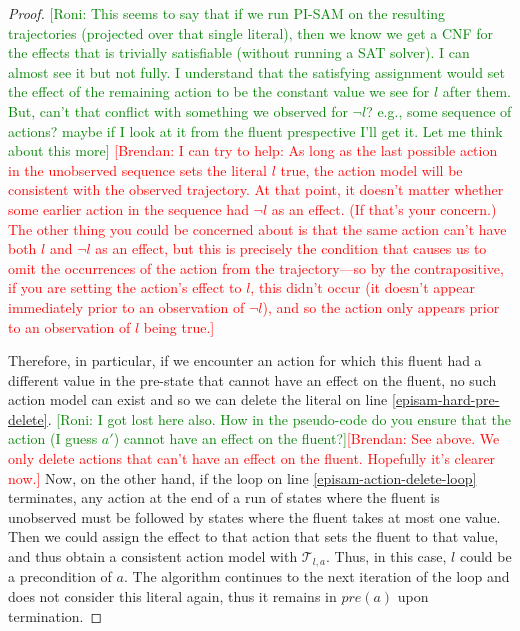 \documentclass[letterpaper]{article} %
\newcommand{\pre}{\textit{pre}}
\newcommand{\brendan}[1]{{\textcolor{red}{[Brendan: #1]}}}
\newcommand{\roni}[1]{{\textcolor{green}{[Roni: #1]}}}
\begin{document}
\begin{proof}
\roni{This seems to say that if we run PI-SAM on the resulting trajectories (projected over that single literal), then we know we get a CNF for the effects that is trivially satisfiable  (without running a SAT solver). I can almost see it but not fully. I understand that the satisfying assignment would set the effect of the remaining action to be the constant value we see for $l$ after them. But, can't that conflict with something we observed for $\neg l$? e.g., some sequence of actions? maybe if I look at it from the fluent prespective I'll get it. Let me think about this more} \brendan{I can try to help: As long as the last possible action in the unobserved sequence sets the literal $l$ true, the action model will be consistent with the observed trajectory. At that point, it doesn't matter whether some earlier action in the sequence had $\neg l$ as an effect. (If that's your concern.) The other thing you could be concerned about is that the same action can't have both $l$ and $\neg l$ as an effect, but this is precisely the condition that causes us to omit the occurrences of the action from the trajectory---so by the contrapositive, if you are setting the action's effect to $l$, this didn't occur (it doesn't appear immediately prior to an observation of $\neg l$), and so the action only appears prior to an observation of $l$ being true.}


Therefore, in particular, if we encounter an action for which this fluent had a different value in the pre-state that cannot have an effect on the fluent, no such action model can exist and so we can delete the literal on line \ref{episam-hard-pre-delete}. \roni{I got lost here also. How in the pseudo-code do you ensure that the action (I guess $a'$) cannot have an effect on the fluent?}\brendan{See above. We only delete actions that can't have an effect on the fluent. Hopefully it's clearer now.}
Now, on the other hand, if the loop on line \ref{episam-action-delete-loop} terminates, any action at the end of a run of states where the fluent is unobserved must be followed by states where the fluent takes at most one value. Then we could assign the effect to that action that sets the fluent to that value, and thus obtain a consistent action model with $\mathcal{T}_{l,a}$. Thus, in this case, $l$ could be a precondition of $a$. The algorithm continues to the next iteration of the loop and does not consider this literal again, thus it remains in $\pre(a)$ upon termination.


\end{proof}
\end{document}
